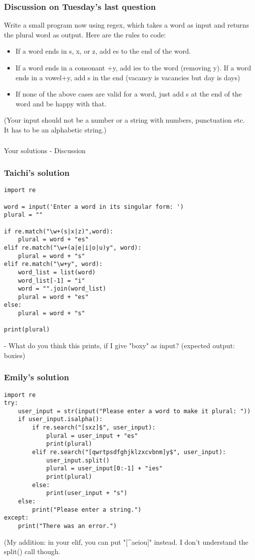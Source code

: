 \documentclass{beamer}
\begin{document}
\begin{frame}[fragile]
\frametitle{Discussion on Tuesday's last question}
Write a small program now using regex, which takes a word as input and returns the plural word as output. Here are the rules to code:
\begin{itemize}
\item If a word ends in s, x, or z, add es to the end of the word.
\item If a word ends in a consonant +y, add ies to the word (removing y). If a word ends in a vowel+y, add s in the end (vacancy is vacancies but day is days) 
\item If none of the above cases are valid for a word, just add s at the end of the word and be happy with that. 
\end{itemize}
(Your input should not be a number or a string with numbers, punctuation etc. It has to be an alphabetic string.)
\end{frame}

\begin{frame}
\frametitle{}
Your solutions - Discussion
\end{frame}

\begin{frame}[fragile]
\frametitle{Taichi's solution}
\footnotesize
\begin{verbatim}
import re

word = input('Enter a word in its singular form: ')
plural = ""

if re.match("\w+(s|x|z)",word):
    plural = word + "es"
elif re.match("\w+(a|e|i|o|u)y", word):
    plural = word + "s"
elif re.match("\w+y", word):
    word_list = list(word)
    word_list[-1] = "i"
    word = "".join(word_list)
    plural = word + "es"
else:
    plural = word + "s"

print(plural)
\end{verbatim}
- What do you think this prints, if I give "boxy" as input? (expected output: boxies)
\end{frame}

\begin{frame}[fragile]
\frametitle{Emily's solution}
\scriptsize
\begin{verbatim}
import re
try:
    user_input = str(input("Please enter a word to make it plural: "))
    if user_input.isalpha():
        if re.search("[sxz]$", user_input):
            plural = user_input + "es"
            print(plural)
        elif re.search("[qwrtpsdfghjklzxcvbnm]y$", user_input):
            user_input.split()
            plural = user_input[0:-1] + "ies"
            print(plural)
        else:
            print(user_input + "s")
    else:
        print("Please enter a string.")
except:
    print("There was an error.")
\end{verbatim}
(My addition: in your elif, you can put "[\^{}aeiou]" instead. I don't understand the split() call though. 
\end{frame}
\end{document}
